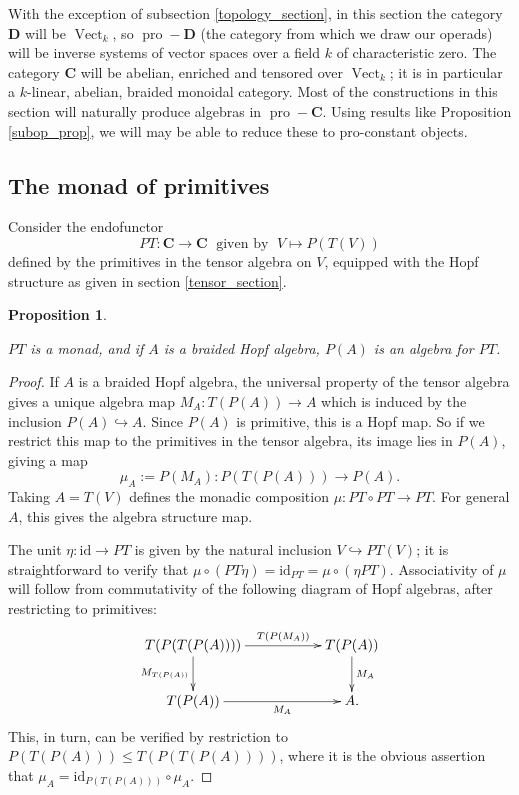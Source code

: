 \documentclass[12pt]{article}
\DeclareMathOperator{\pro}{pro}
\DeclareMathOperator{\Vect}{Vect}
\newcommand{\bC} {\mathbf{C}}
\newcommand{\bD} {\mathbf{D}}
\newcommand{\id}{\mbox{id}}
\theoremstyle{plain}
\newtheorem{prop}[thm]{Proposition}
\theoremstyle{definition}
\theoremstyle{remark}
\begin{document}
With the exception of subsection \ref{topology_section}, in this section the category $\bD$ will be $\Vect_k$, so $\pro-\bD$ (the category from which we draw our operads) will be inverse systems of vector spaces over a field $k$ of characteristic zero.  The category $\bC$ will be abelian, enriched and tensored over $\Vect_k$; it is in particular a $k$-linear, abelian, braided monoidal category.  Most of the constructions in this section will naturally produce algebras in $\pro-\bC$.  Using results like Proposition \ref{subop_prop}, we will may be able to reduce these to pro-constant objects.

\subsection{The monad of primitives} \label{monad_prim_sec}

Consider the endofunctor 
%
$$PT: \bC \to \bC \; \mbox{ given by } \; V \mapsto P(T(V))$$
%
defined by the primitives in the tensor algebra on $V$, equipped with the Hopf structure as given in section \ref{tensor_section}.

\begin{prop} \label{PT_prop}

$PT$ is a monad, and if $A$ is a braided Hopf algebra, $P(A)$ is an algebra for $PT$.

\end{prop}

\begin{proof}

If $A$ is a braided Hopf algebra, the universal property of the tensor algebra gives a unique algebra map $M_A: T(P(A)) \to A$ which is induced by the inclusion $P(A) \hookrightarrow A$.  Since $P(A)$ is primitive, this is a Hopf map.  So if we restrict this map to the primitives in the tensor algebra, its image lies in $P(A)$, giving a map
%
$$\mu_A:= P(M_A): P(T(P(A))) \to P(A).$$
%
Taking $A=T(V)$ defines the monadic composition $\mu: PT \circ PT \to PT$.  For general $A$, this gives the algebra structure map.

The unit $\eta: \id \to PT$ is given by the natural inclusion $V \hookrightarrow PT(V)$; it is straightforward to verify that $\mu \circ (PT\eta) = \id_{PT} = \mu \circ (\eta PT)$.  Associativity of $\mu$ will follow from commutativity of the following diagram of Hopf algebras, after restricting to primitives:
%
$$\xymatrix{
T(P(T(P(A)))) \ar[rr]^-{T(P(M_A))} \ar[d]_-{M_{T(P(A))}} & & T(P(A)) \ar[d]^-{M_A} \\
T(P(A)) \ar[rr]_-{M_A} & & A.
}$$
%
This, in turn, can be verified by restriction to $P(T(P(A))) \leq T(P(T(P(A))))$, where it is the obvious assertion that $\mu_A = \id_{P(T(P(A)))} \circ \mu_A$.

\end{proof}
\end{document}
